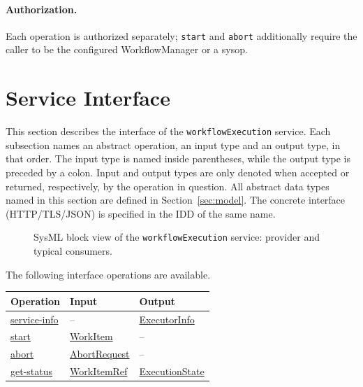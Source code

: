 \documentclass[a4paper]{arrowhead}
\newcommand{\mref}[1]{{\textcolor{ArrowheadPurple}{\hyperref[sec:model:#1]{#1}}}}
\newcommand{\oref}[1]{{\textcolor{ArrowheadBlue}{\hyperref[sec:operations:#1]{#1}}}}
\begin{document}
\paragraph{Authorization.} Each operation is authorized separately; \texttt{start} and \texttt{abort} additionally require the caller to be the configured WorkflowManager or a sysop.

\newpage
\section{Service Interface}
\label{sec:operations}
This section describes the interface of the \texttt{workflowExecution} service. Each subsection names an abstract operation,
an input type and an output type, in that order. The input type is named inside parentheses, while the output type is
preceded by a colon. Input and output types are only denoted when accepted or returned, respectively, by the operation
in question. All abstract data types named in this section are defined in Section~\ref{sec:model}. The concrete
interface (HTTP/TLS/JSON) is specified in the IDD of the same name.

\begin{figure}[ht!]
  \centering
  \caption{SysML block view of the \texttt{workflowExecution} service: provider and typical consumers.}
  \label{fig:SD}
\end{figure}

The following interface operations are available.

{\small
\begin{longtable}{|p{4.4cm}|p{5.6cm}|p{5.8cm}|}

\hline
\rowcolor{gray!33} Operation & Input & Output \\ \hline
\endhead
\oref{service-info} & -- & \mref{ExecutorInfo} \\ \hline
\oref{start} & \mref{WorkItem} & -- \\ \hline
\oref{abort} & \mref{AbortRequest} & -- \\ \hline
\oref{get-status} & \mref{WorkItemRef} & \mref{ExecutionState} \\ \hline
\end{longtable}
}
\end{document}

